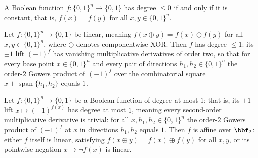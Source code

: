 \begin{lemma}
\label{LowDegreeTest.degree_le_zero_iff_constant}
\leanok
{}
A Boolean function $f : \{0,1\}^n \to \{0,1\}$ has degree $\le 0$ if and only if it is
constant, that is, $f(x) = f(y)$ for all $x, y \in \{0,1\}^n$.
\end{lemma}

\begin{lemma}
\label{LowDegreeTest.linear_is_degree_le_one}
\leanok
{}
Let $f : \{0,1\}^n \to \{0,1\}$ be linear, meaning $f(x \oplus y) = f(x) \oplus f(y)$
for all $x, y \in \{0,1\}^n$, where $\oplus$ denotes componentwise XOR. Then $f$ has
degree $\le 1$: its $\pm 1$ lift $(-1)^f$ has vanishing multiplicative derivatives of
order two, so that for every base point $x \in \{0,1\}^n$ and every pair of directions
$h_1, h_2 \in \{0,1\}^n$ the order-$2$ Gowers product of $(-1)^f$ over the combinatorial
square $x + \operatorname{span}\{h_1, h_2\}$ equals $1$.
\end{lemma}

\begin{lemma}
\label{LowDegreeTest.degree_le_one_implies_affine}
\leanok
{}
Let $f : \{0,1\}^n \to \{0,1\}$ be a Boolean function of degree at most $1$; that is,
its $\pm 1$ lift $x \mapsto (-1)^{f(x)}$ has degree at most $1$, meaning every
second-order multiplicative derivative is trivial: for all $x, h_1, h_2 \in \{0,1\}^n$
the order-$2$ Gowers product of $(-1)^f$ at $x$ in directions $h_1, h_2$ equals $1$.
Then $f$ is affine over $\bbf_2$: either $f$ itself is linear, satisfying $f(x \oplus y)
= f(x) \oplus f(y)$ for all $x, y$, or its pointwise negation $x \mapsto \lnot f(x)$ is
linear.
\end{lemma}

